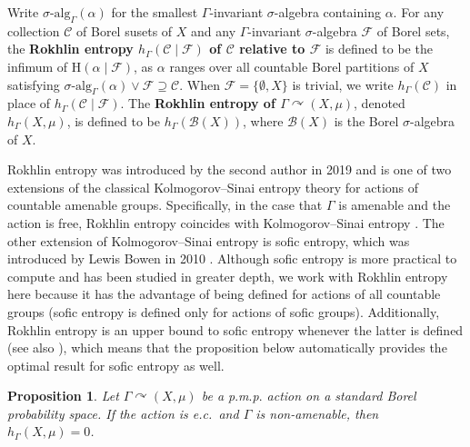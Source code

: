 \documentclass[12pt]{amsart}
\newtheorem{prop}[thm]{Proposition}
\theoremstyle{definition}
\newcommand{\cF}{\mathcal{F}}
\newcommand{\pmp}{p{$.$}m{$.$}p{$.$}}
\newcommand{\acts}{\curvearrowright}
\newcommand{\salg}{\sigma \text{-}\mathrm{alg}}
\newcommand{\sH}{\mathrm{H}}
\newcommand{\rh}{h}
\newcommand{\Borel}{\mathcal{B}}
\newcommand{\given}{\mathbin{|}}
\begin{document}
Write $\salg_\Gamma(\alpha)$ for the smallest $\Gamma$-invariant $\sigma$-algebra containing $\alpha$.  For any collection $\mathcal{C}$ of Borel susets of $X$ and any $\Gamma$-invariant $\sigma$-algebra $\cF$ of Borel sets, the \textbf{Rokhlin entropy $\rh_\Gamma(\mathcal{C} \given \cF)$ of $\mathcal{C}$ relative to $\cF$} is defined to be the infimum of $\sH(\alpha \given \cF)$, as $\alpha$ ranges over all countable Borel partitions of $X$ satisfying $\salg_\Gamma(\alpha) \vee \cF \supseteq \mathcal{C}$. When $\cF = \{\emptyset, X\}$ is trivial, we write $\rh_\Gamma(\mathcal{C})$ in place of $\rh_\Gamma(\mathcal{C} \given \cF)$. The 
\textbf{Rokhlin entropy of $\Gamma \acts (X, \mu)$}, denoted $\rh_\Gamma(X, \mu)$, is defined to be $\rh_\Gamma(\Borel(X))$, where $\Borel(X)$ is the Borel $\sigma$-algebra of $X$.

Rokhlin entropy was introduced by the second author in 2019 \cite{Sew19} and is one of two extensions of the classical Kolmogorov--Sinai entropy theory for actions of countable amenable groups. Specifically, in the case that $\Gamma$ is amenable and the action is free, Rokhlin entropy coincides with Kolmogorov--Sinai entropy \cite[Cor. 1.9]{AlpSew}. The other extension of Kolmogorov--Sinai entropy is sofic entropy, which was introduced by Lewis Bowen in 2010 \cite{Bowen10}. Although sofic entropy is more practical to compute and has been studied in greater depth, we work with Rokhlin entropy here because it has the advantage of being defined for actions of all countable groups (sofic entropy is defined only for actions of sofic groups). Additionally, Rokhlin entropy is an upper bound to sofic entropy whenever the latter is defined \cite[Prop. 1.10]{AlpSew} (see also \cite[Prop. 5.3]{Bowen10}), which means that the proposition below automatically provides the optimal result for sofic entropy as well.

\begin{prop}
Let $\Gamma \acts (X, \mu)$ be a {\pmp} action on a standard Borel probability space. If the action is e.c.\ and $\Gamma$ is non-amenable, then $\rh_\Gamma(X, \mu) = 0$.
\end{prop}
\end{document}
